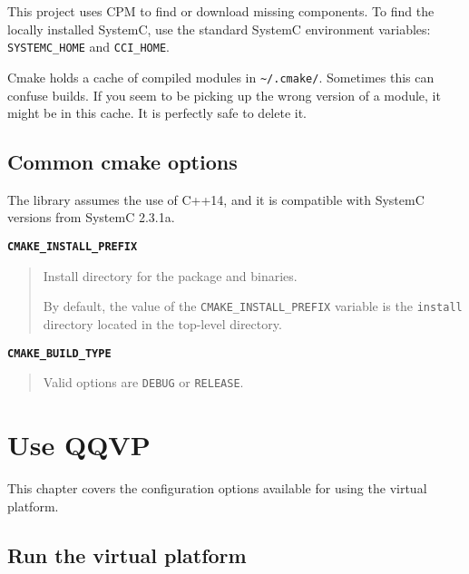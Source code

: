 This project uses CPM {} to find or download missing components. To find the locally installed SystemC, use the standard SystemC environment variables: {\small{\lstinline!SYSTEMC_HOME!}} and {\small{\lstinline!CCI_HOME!}}.

Cmake holds a cache of compiled modules in {\small{\lstinline!~/.cmake/!}}. Sometimes this can confuse builds. If you seem to be picking up the wrong version of a module, it might be in this cache. It is perfectly safe to delete it.


\clearpage
\section{Common cmake options}

The library assumes the use of C++14, and it is compatible with SystemC versions from SystemC 2.3.1a.

{\textbf {\footnotesize{\lstinline!CMAKE_INSTALL_PREFIX!}}}
\begin{quote}
Install directory for the package and binaries.

By default, the value of the {\small{\lstinline!CMAKE_INSTALL_PREFIX!}} variable is the {\small{\lstinline!install!}} directory located in the top-level directory.
\end{quote}

{\textbf {\footnotesize{\lstinline!CMAKE_BUILD_TYPE!}}}
\begin{quote}
Valid options are {\small{\lstinline!DEBUG!}} or {\small{\lstinline!RELEASE!}}.
\end{quote}



\chapter{Use QQVP}

This chapter covers the configuration options available for using the virtual platform.


\section{Run the virtual platform}

